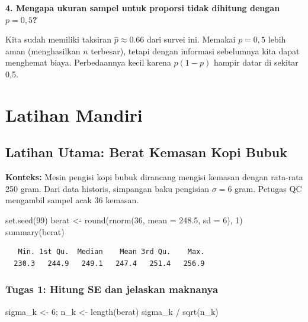 \documentclass[
  indonesian,
  letterpaper,
]{book}
\newenvironment{Shaded}{\begin{snugshade}}{\end{snugshade}}
\newcommand{\AttributeTok}[1]{\textcolor[rgb]{0.40,0.45,0.13}{#1}}
\newcommand{\DecValTok}[1]{\textcolor[rgb]{0.68,0.00,0.00}{#1}}
\newcommand{\FloatTok}[1]{\textcolor[rgb]{0.68,0.00,0.00}{#1}}
\newcommand{\FunctionTok}[1]{\textcolor[rgb]{0.28,0.35,0.67}{#1}}
\newcommand{\NormalTok}[1]{\textcolor[rgb]{0.00,0.23,0.31}{#1}}
\newcommand{\OtherTok}[1]{\textcolor[rgb]{0.00,0.23,0.31}{#1}}
\newcommand{\SpecialCharTok}[1]{\textcolor[rgb]{0.37,0.37,0.37}{#1}}
\begin{document}
\textbf{4. Mengapa ukuran sampel untuk proporsi tidak dihitung dengan
\(p = 0{,}5\)?}

Kita sudah memiliki taksiran \(\hat{p} \approx 0.66\) dari survei ini.
Memakai \(p = 0{,}5\) lebih aman (menghasilkan \(n\) terbesar), tetapi
dengan informasi sebelumnya kita dapat menghemat biaya. Perbedaannya
kecil karena \(p(1-p)\) hampir datar di sekitar 0,5.

\section{Latihan Mandiri}\label{latihan-mandiri}

\subsection{Latihan Utama: Berat Kemasan Kopi
Bubuk}\label{latihan-utama-berat-kemasan-kopi-bubuk}

\textbf{Konteks:} Mesin pengisi kopi bubuk dirancang mengisi kemasan
dengan rata-rata 250 gram. Dari data historis, simpangan baku pengisian
\(\sigma = 6\) gram. Petugas QC mengambil sampel acak 36 kemasan.

\begin{Shaded}
\begin{Highlighting}[]
\FunctionTok{set.seed}\NormalTok{(}\DecValTok{99}\NormalTok{)}
\NormalTok{berat }\OtherTok{\textless{}{-}} \FunctionTok{round}\NormalTok{(}\FunctionTok{rnorm}\NormalTok{(}\DecValTok{36}\NormalTok{, }\AttributeTok{mean =} \FloatTok{248.5}\NormalTok{, }\AttributeTok{sd =} \DecValTok{6}\NormalTok{), }\DecValTok{1}\NormalTok{)}
\FunctionTok{summary}\NormalTok{(berat)}
\end{Highlighting}
\end{Shaded}

\begin{verbatim}
   Min. 1st Qu.  Median    Mean 3rd Qu.    Max. 
  230.3   244.9   249.1   247.4   251.4   256.9 
\end{verbatim}

\subsubsection{\texorpdfstring{\textbf{Tugas 1: Hitung SE dan jelaskan
maknanya}}{Tugas 1: Hitung SE dan jelaskan maknanya}}\label{tugas-1-hitung-se-dan-jelaskan-maknanya}

\begin{Shaded}
\begin{Highlighting}[]
\NormalTok{sigma\_k }\OtherTok{\textless{}{-}} \DecValTok{6}\NormalTok{; n\_k }\OtherTok{\textless{}{-}} \FunctionTok{length}\NormalTok{(berat)}
\NormalTok{sigma\_k }\SpecialCharTok{/} \FunctionTok{sqrt}\NormalTok{(n\_k)}
\end{Highlighting}
\end{Shaded}
\end{document}
